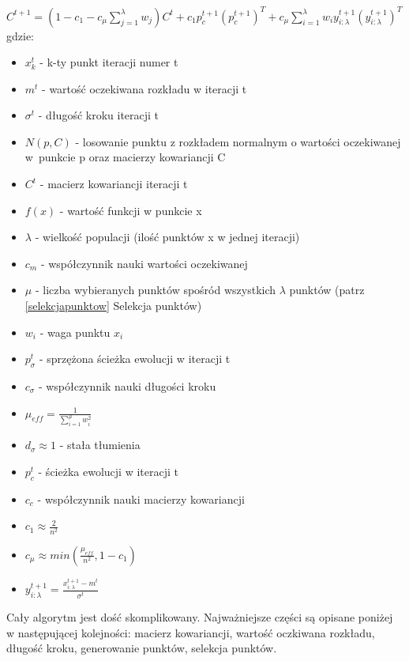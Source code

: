 \documentclass{mini}
\begin{document}
\hspace{8,5ex} $C^{t+1} = (1-c_1-c_\mu\sum\limits_{j=1}^\lambda w_j)C^t+c_1p_c^{t+1}{(p_c^{t+1})}^T+c_\mu \sum\limits_{i=1}^\lambda w_iy_{i:\lambda}^{t+1}{(y_{i:\lambda}^{t+1})}^T$
\newline
gdzie:
\begin{itemize}[noitemsep]
\item $x_k^t$ - k-ty punkt iteracji numer t
\item $m^t$ - wartość oczekiwana rozkładu w iteracji t
\item $\sigma^t$ - długość kroku iteracji t
\item $N(p,C)$ - losowanie punktu z rozkładem normalnym o wartości oczekiwanej w~punkcie p oraz macierzy kowariancji C
\item $C^t$ - macierz kowariancji iteracji t
\item $f(x)$ - wartość funkcji w punkcie x
\item $\lambda$ - wielkość populacji (ilość punktów x w jednej iteracji)
\item $c_m$ - współczynnik nauki wartości oczekiwanej
\item $\mu$ - liczba wybieranych punktów spośród wszystkich $\lambda$ punktów (patrz \ref{selekcjapunktow} Selekcja punktów)
\item $w_i$ - waga punktu $x_i$
\item $p_\sigma^t$ - sprzężona ścieżka ewolucji w iteracji t
\item $c_\sigma$ - współczynnik nauki długości kroku
\item $\mu_{eff}=\frac{1}{\sum\limits_{i=1}^\mu w_i^2}$
\item $d_\sigma \approx 1$ - stała tłumienia
\item $p_c^t$ - ścieżka ewolucji w iteracji t
\item $c_c$ - współczynnik nauki macierzy kowariancji
\item $c_1 \approx \frac{2}{n^2}$
\item $c_\mu \approx min(\frac{\mu_{eff}}{n^2}, 1-c_1)$
\item $y_{i:\lambda}^{t+1} = \frac{x_{i:\lambda}^{t+1}-m^t}{\sigma^t}$
\end{itemize}

Cały algorytm jest dość skomplikowany. Najważniejsze części są opisane poniżej w następującej kolejności: macierz kowariancji, wartość oczkiwana rozkładu, długość kroku, generowanie punktów, selekcja punktów.
\end{document}
